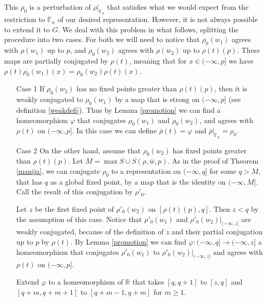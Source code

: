\documentclass[12pt]{article}
\newcommand{\F}{\mathbb{F}}
\newcommand{\R}{\mathbb{R}}
\theoremstyle{definition}
\begin{document}
This $\rho_0$ is a perturbation of $\rho|_{\F_n}$ that satisfies what we would expect from the restriction to $\F_n$ of our desired representation. However, it is not always possible to extend it to $G$. We deal with this problem in what follows, splitting the procedure into two cases. For both we will need to notice that $\rho_0(w_1)$ agrees with $\rho(w_1)$ up to $p$, and $\rho_0(w_2)$ agrees with $\rho(w_2)$ up to $\rho(t)(p)$. These maps are partially conjugated by $\rho(t)$, meaning that for $x\in(-\infty,p]$ we have $\rho(t)\rho_0(w_1)(x)=\rho_0(w_2)\rho(t)(x)$.

\begin{itemize}


\item[Case 1] If $\rho_0(w_2)$ has no fixed points greater than $\rho(t)(p)$, then it is weakly conjugated to $\rho_0(w_1)$ by a map that is strong on $(-\infty,p]$ (see definition \ref{weakdefi}). Thus by Lemma \ref{promotion} we can find a homeomorphism $\varphi$ that conjugates $\rho_0(w_1)$ and $\rho_0(w_2)$, and agrees with $\rho(t)$ on $(-\infty,p]$. In this case we can define $\bar \rho(t)=\varphi$ and $\bar \rho|_{\F_n}=\rho_0$. 

\item[Case 2] On the other hand, assume that $\rho_0(w_2)$ has fixed points greater than $\rho(t)(p)$. Let $M=\max S\cup S(\rho,\bar w,p)$. As in the proof of Theorem \ref{manija}, we can conjugate $\rho_0$ to a representation on $(-\infty,q]$ for some $q>M$, that has $q$ as a global fixed point, by a map that is the identity on $(-\infty,M]$. Call the result of this conjugation by $\rho'_0$.

Let $z$ be the first fixed point of $\rho'_0(w_2)$ on $[\rho(t)(p),q]$. Then $z<q$ by the assumption of this case. Notice that $\rho'_0(w_1)$ and $\rho'_0(w_2)|_{(-\infty,z]}$ are weakly conjugated, because of the definition of $z$ and their partial conjugation up to $p$ by $\rho(t)$. By Lemma \ref{promotion} we can find $\varphi:(-\infty,q]\to(-\infty,z]$ a homeomorphism that conjugates $\rho'_0(w_1)$ to $\rho'_0(w_2)|_{(-\infty,z]}$ and agrees with $\rho(t)$ on $(-\infty,p]$.

Extend $\varphi$ to a homeomorphism of $\R$ that takes $[q,q+1]$ to $[z,q]$ and $[q+m,q+m+1]$ to $[q+m-1,q+m]$ for $m\geq 1$.


\end{itemize}
\end{document}

